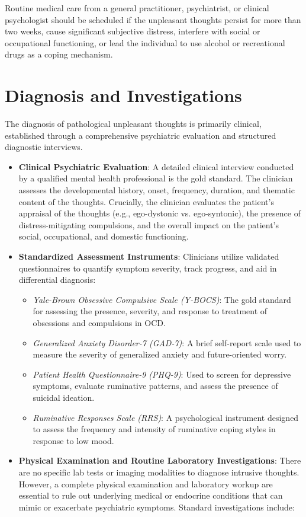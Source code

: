 Routine medical care from a general practitioner, psychiatrist, or clinical psychologist should be scheduled if the unpleasant thoughts persist for more than two weeks, cause significant subjective distress, interfere with social or occupational functioning, or lead the individual to use alcohol or recreational drugs as a coping mechanism.

\section*{Diagnosis and Investigations}
The diagnosis of pathological unpleasant thoughts is primarily clinical, established through a comprehensive psychiatric evaluation and structured diagnostic interviews.
\begin{itemize}
  \item \textbf{Clinical Psychiatric Evaluation}: A detailed clinical interview conducted by a qualified mental health professional is the gold standard. The clinician assesses the developmental history, onset, frequency, duration, and thematic content of the thoughts. Crucially, the clinician evaluates the patient's appraisal of the thoughts (e.g., ego-dystonic vs. ego-syntonic), the presence of distress-mitigating compulsions, and the overall impact on the patient's social, occupational, and domestic functioning.
  \item \textbf{Standardized Assessment Instruments}: Clinicians utilize validated questionnaires to quantify symptom severity, track progress, and aid in differential diagnosis:
    \begin{itemize}
      \item \textit{Yale-Brown Obsessive Compulsive Scale (Y-BOCS)}: The gold standard for assessing the presence, severity, and response to treatment of obsessions and compulsions in OCD.
      \item \textit{Generalized Anxiety Disorder-7 (GAD-7)}: A brief self-report scale used to measure the severity of generalized anxiety and future-oriented worry.
      \item \textit{Patient Health Questionnaire-9 (PHQ-9)}: Used to screen for depressive symptoms, evaluate ruminative patterns, and assess the presence of suicidal ideation.
      \item \textit{Ruminative Responses Scale (RRS)}: A psychological instrument designed to assess the frequency and intensity of ruminative coping styles in response to low mood.
    \end{itemize}
  \item \textbf{Physical Examination and Routine Laboratory Investigations}: There are no specific lab tests or imaging modalities to diagnose intrusive thoughts. However, a complete physical examination and laboratory workup are essential to rule out underlying medical or endocrine conditions that can mimic or exacerbate psychiatric symptoms. Standard investigations include:

\end{itemize}
